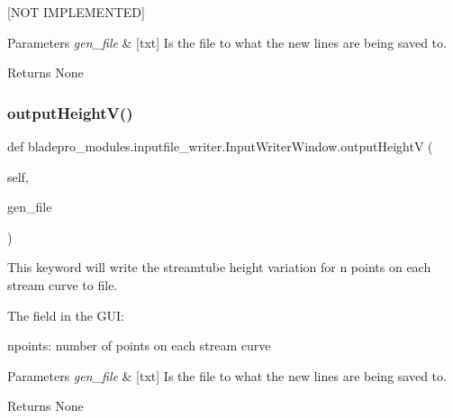 \mbox{[}N\+OT I\+M\+P\+L\+E\+M\+E\+N\+T\+ED\mbox{]} 


\begin{DoxyParams}{Parameters}
{\em gen\+\_\+file} & \mbox{[}txt\mbox{]} Is the file to what the new lines are being saved to. \\
\hline
\end{DoxyParams}
\begin{DoxyReturn}{Returns}
None 
\end{DoxyReturn}
\hypertarget{classbladepro__modules_1_1inputfile__writer_1_1_input_writer_window_a15fdf4aaecf99b885796124500f80114}{}\label{classbladepro__modules_1_1inputfile__writer_1_1_input_writer_window_a15fdf4aaecf99b885796124500f80114} 
\subsubsection{\texorpdfstring{output\+Height\+V()}{outputHeightV()}}
{\footnotesize\ttfamily def bladepro\+\_\+modules.\+inputfile\+\_\+writer.\+Input\+Writer\+Window.\+output\+HeightV (\begin{DoxyParamCaption}\item[{}]{self,  }\item[{}]{gen\+\_\+file }\end{DoxyParamCaption})}



This keyword will write the streamtube height variation for n points on each stream curve to file. 

The field in the G\+UI\+: \begin{DoxyItemize}
\item {\ttfamily npoints\+:} number of points on each stream curve\end{DoxyItemize}

\begin{DoxyParams}{Parameters}
{\em gen\+\_\+file} & \mbox{[}txt\mbox{]} Is the file to what the new lines are being saved to. \\
\hline
\end{DoxyParams}
\begin{DoxyReturn}{Returns}
None 
\end{DoxyReturn}
\hypertarget{classbladepro__modules_1_1inputfile__writer_1_1_input_writer_window_a8e556016279f9aabdabb9b6f708c95cb}{}\label{classbladepro__modules_1_1inputfile__writer_1_1_input_writer_window_a8e556016279f9aabdabb9b6f708c95cb} 
